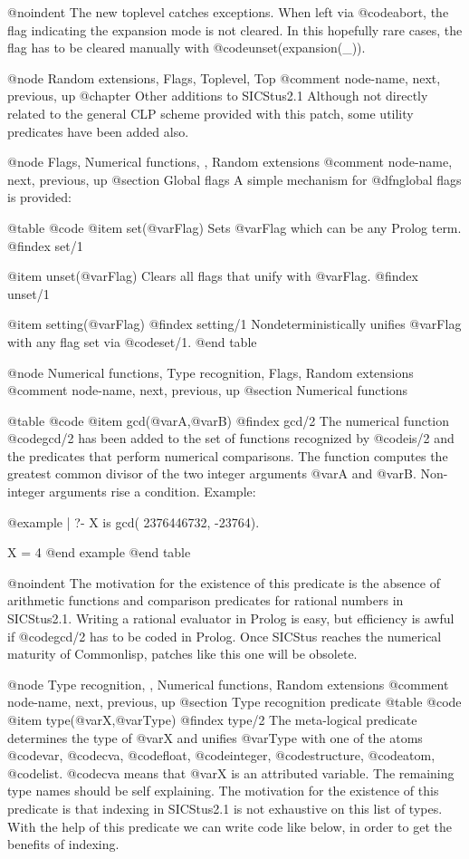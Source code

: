 @noindent 
The new toplevel catches exceptions. When left via @code{abort},
the flag indicating the expansion mode is not cleared. In this
hopefully rare cases, the flag has to be cleared manually with
@code{unset(expansion(_))}.

@node Random extensions, Flags, Toplevel, Top    
@comment  node-name,  next,  previous,  up
@chapter Other additions to SICStus2.1
Although not directly related to the general CLP scheme provided with 
this patch, some utility predicates have been added also.

@node Flags, Numerical functions, , Random extensions
@comment  node-name,  next,  previous,  up
@section Global flags
A simple mechanism for @dfn{global flags} is provided:

@table @code
@item set(@var{Flag})
Sets @var{Flag} which can be any Prolog term.
@findex set/1

@item unset(@var{Flag})
Clears all flags that unify with @var{Flag}.
@findex unset/1

@item setting(@var{Flag})
@findex setting/1
Nondeterministically unifies @var{Flag} with any flag set via
@code{set/1}.
@end table

@node Numerical functions, Type recognition, Flags, Random extensions    
@comment  node-name,  next,  previous,  up
@section Numerical functions

@table @code
@item gcd(@var{A},@var{B})
@findex gcd/2
The numerical function @code{gcd/2} has been added to the set of
functions recognized by @code{is/2} and the predicates that perform
numerical comparisons. The function computes the greatest common divisor
of the two integer arguments @var{A} and @var{B}. Non-integer arguments
rise a condition. Example:

@example
| ?-  X is gcd( 2376446732, -23764).

X = 4 
@end example
@end table

@noindent
The motivation for the existence of this predicate is the absence of
arithmetic functions and comparison predicates for rational numbers in
SICStus2.1. Writing a rational evaluator in Prolog is easy, but
efficiency is awful if @code{gcd/2} has to be coded in Prolog. Once
SICStus reaches the numerical maturity of Commonlisp, patches like this
one will be obsolete.

@node Type recognition, , Numerical functions, Random extensions
@comment  node-name,  next,  previous,  up
@section Type recognition predicate
@table @code
@item type(@var{X},@var{Type})
@findex type/2
The meta-logical predicate determines the type of @var{X} and unifies
@var{Type} with one of the atoms @code{var}, @code{cva}, @code{float},
@code{integer}, @code{structure}, @code{atom}, @code{list}. @code{cva}
means that @var{X} is an attributed variable.  The remaining type names
should be self explaining.  The motivation for the existence of this
predicate is that indexing in SICStus2.1 is not exhaustive on this list
of types.  With the help of this predicate we can write code like below,
in order to get the benefits of indexing.

